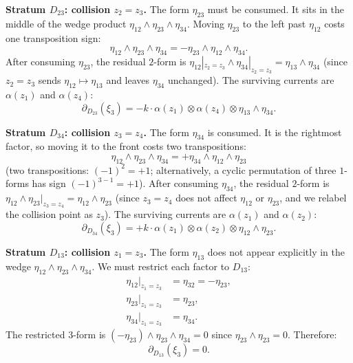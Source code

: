 \medskip
\noindent\textbf{Stratum $D_{23}$: collision $z_2 = z_3$.}
The form $\eta_{23}$ must be consumed.  It sits in the middle
of the wedge product $\eta_{12} \wedge \eta_{23} \wedge \eta_{34}$.
Moving $\eta_{23}$ to the left past $\eta_{12}$ costs one
transposition sign:
\[
\eta_{12} \wedge \eta_{23} \wedge \eta_{34}
= -\eta_{23} \wedge \eta_{12} \wedge \eta_{34}.
\]
After consuming $\eta_{23}$, the residual $2$-form is
$\eta_{12}|_{z_2 = z_3} \wedge \eta_{34}|_{z_2 = z_3}
= \eta_{13} \wedge \eta_{34}$
(since $z_2 = z_3$ sends $\eta_{12} \mapsto \eta_{13}$
and leaves $\eta_{34}$ unchanged).
The surviving currents are $\alpha(z_1)$ and $\alpha(z_4)$:
\begin{equation}\label{eq:frame-D23-deg3}
\partial_{D_{23}}(\xi_3)
= -k \cdot \alpha(z_1) \otimes \alpha(z_4)
  \otimes \eta_{13} \wedge \eta_{34}.
\end{equation}

\medskip
\noindent\textbf{Stratum $D_{34}$: collision $z_3 = z_4$.}
The form $\eta_{34}$ is consumed.  It is the rightmost factor,
so moving it to the front costs two transpositions:
\[
\eta_{12} \wedge \eta_{23} \wedge \eta_{34}
= +\eta_{34} \wedge \eta_{12} \wedge \eta_{23}
\]
(two transpositions: $(-1)^2 = +1$; alternatively, a cyclic
permutation of three $1$-forms has sign $(-1)^{3-1} = +1$).
After consuming $\eta_{34}$, the residual $2$-form is
$\eta_{12} \wedge \eta_{23}|_{z_3 = z_4}
= \eta_{12} \wedge \eta_{23}$
(since $z_3 = z_4$ does not affect $\eta_{12}$ or $\eta_{23}$,
and we relabel the collision point as $z_3$).
The surviving currents are $\alpha(z_1)$ and $\alpha(z_2)$:
\begin{equation}\label{eq:frame-D34-deg3}
\partial_{D_{34}}(\xi_3)
= +k \cdot \alpha(z_1) \otimes \alpha(z_2)
  \otimes \eta_{12} \wedge \eta_{23}.
\end{equation}

\medskip
\noindent\textbf{Stratum $D_{13}$: collision $z_1 = z_3$.}
The form $\eta_{13}$ does not appear explicitly in the wedge
$\eta_{12} \wedge \eta_{23} \wedge \eta_{34}$.  We must restrict
each factor to $D_{13}$:
\begin{align*}
\eta_{12}\big|_{z_1 = z_3} &= \eta_{32} = -\eta_{23}, \\
\eta_{23}\big|_{z_1 = z_3} &= \eta_{23}, \\
\eta_{34}\big|_{z_1 = z_3} &= \eta_{34}.
\end{align*}
The restricted $3$-form is
$(-\eta_{23}) \wedge \eta_{23} \wedge \eta_{34}
= 0$
since $\eta_{23} \wedge \eta_{23} = 0$.
Therefore:
\begin{equation}\label{eq:frame-D13-deg3}
\partial_{D_{13}}(\xi_3) = 0.
\end{equation}

